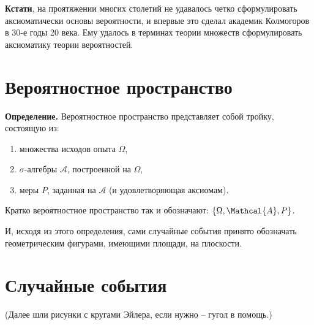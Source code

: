 \documentclass{article}
\begin{document}
\textbf{Кстати}, на проятяжении многих столетий не удавалось четко сформулировать аксиоматически основы вероятности, и впервые это сделал академик Колмогоров в 30-е годы 20 века. Ему удалось в терминах теории множеств сформулировать аксиоматику теории вероятностей.

\section{Вероятностное пространство}

\textbf{Определение.} Вероятностное пространство представляет собой тройку, состоящую из:

\begin{enumerate}
\item множества исходов опыта $\Omega$,

\item $\sigma$-алгебры $\mathcal{A}$, построенной на $\Omega$,

\item меры $P$, заданная на $\mathcal{A}$ (и удовлетворяющая аксиомам).
\end{enumerate}

Кратко вероятностное пространство так и обозначают: $\{\Omega, \Mathcal{A}, P\}$.

И, исходя из этого определения, сами случайные события принято обозначать геометрическим фигурами, имеющими площади, на плоскости.

\section{Случайные события}

(Далее шли рисунки с кругами Эйлера, если нужно -- гугол в помощь.)
\end{document}
